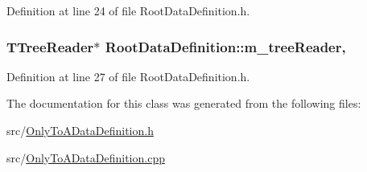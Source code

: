 Definition at line 24 of file Root\+Data\+Definition.\+h.

\hypertarget{classRootDataDefinition_a919827bdd245e61c0f54676d59cc7448}{
\subsubsection[{m\+\_\+tree\+Reader}]{\setlength{\rightskip}{0pt plus 5cm}T\+Tree\+Reader$\ast$ Root\+Data\+Definition\+::m\+\_\+tree\+Reader\hspace{0.3cm}{\ttfamily [protected]}, {\ttfamily [inherited]}}}\label{classRootDataDefinition_a919827bdd245e61c0f54676d59cc7448}


Definition at line 27 of file Root\+Data\+Definition.\+h.



The documentation for this class was generated from the following files\+:\begin{DoxyCompactItemize}
\item 
src/\hyperlink{OnlyToADataDefinition_8h}{Only\+To\+A\+Data\+Definition.\+h}\item 
src/\hyperlink{OnlyToADataDefinition_8cpp}{Only\+To\+A\+Data\+Definition.\+cpp}\end{DoxyCompactItemize}
